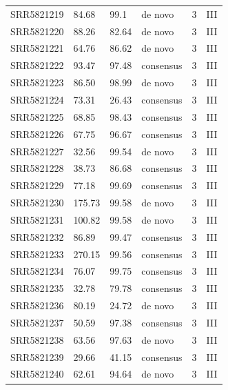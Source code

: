 \begin{longtable}{@{}llllll@{}}
SRR5821219 & 84.68         & 99.1        & de novo      & 3        & III      \\
SRR5821220 & 88.26         & 82.64       & de novo      & 3        & III      \\
SRR5821221 & 64.76         & 86.62       & de novo      & 3        & III      \\
SRR5821222 & 93.47         & 97.48       & consensus    & 3        & III      \\
SRR5821223 & 86.50         & 98.99       & de novo      & 3        & III      \\
SRR5821224 & 73.31         & 26.43       & consensus    & 3        & III      \\
SRR5821225 & 68.85         & 98.43       & consensus    & 3        & III      \\
SRR5821226 & 67.75         & 96.67       & consensus    & 3        & III      \\
SRR5821227 & 32.56         & 99.54       & de novo      & 3        & III      \\
SRR5821228 & 38.73         & 86.68       & consensus    & 3        & III      \\
SRR5821229 & 77.18         & 99.69       & consensus    & 3        & III      \\
SRR5821230 & 175.73        & 99.58       & de novo      & 3        & III      \\
SRR5821231 & 100.82        & 99.58       & de novo      & 3        & III      \\
SRR5821232 & 86.89         & 99.47       & consensus    & 3        & III      \\
SRR5821233 & 270.15        & 99.56       & consensus    & 3        & III      \\
SRR5821234 & 76.07         & 99.75       & consensus    & 3        & III      \\
SRR5821235 & 32.78         & 79.78       & consensus    & 3        & III      \\
SRR5821236 & 80.19         & 24.72       & de novo      & 3        & III      \\
SRR5821237 & 50.59         & 97.38       & consensus    & 3        & III      \\
SRR5821238 & 63.56         & 97.63       & de novo      & 3        & III      \\
SRR5821239 & 29.66         & 41.15       & consensus    & 3        & III      \\
SRR5821240 & 62.61         & 94.64       & de novo      & 3        & III      \\

\end{longtable}
